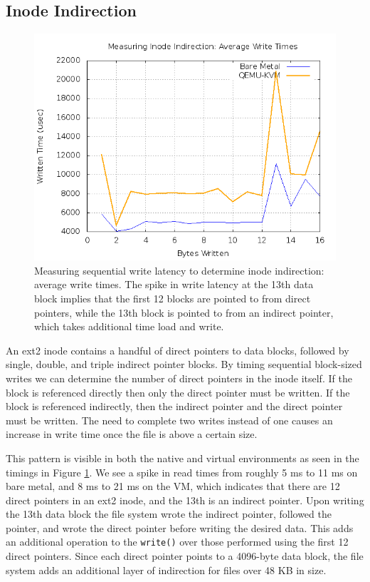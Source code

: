 \documentclass[letterpaper,twocolumn,10pt]{article}
\begin{document}
\subsection{Inode Indirection}
\begin{figure}[!ht]
\includegraphics[scale=.35]{combined_graphs/inode_avg.png}
\caption{Measuring sequential write latency to determine inode indirection: average write times. The spike in write latency at the 13th data block implies that the first 12 blocks are pointed to from direct pointers, while the 13th block is pointed to from an indirect pointer, which takes additional time load and write.}
\label{fig:inode_avg}
\end{figure}
An ext2 inode contains a handful of direct pointers to data blocks, followed by single, double, and triple indirect pointer blocks.
By timing sequential block-sized writes we can determine the number of direct pointers in the inode itself.
If the block is referenced directly then only the direct pointer must be written.
If the block is referenced indirectly, then the indirect pointer and the direct pointer must be written.
The need to complete two writes instead of one causes an increase in write time once the file is above a certain size.

This pattern is visible in both the native and virtual environments as seen in the timings in Figure \ref{fig:inode_avg}. %
We see a spike in read times from roughly 5 ms to 11 ms on bare metal, and 8 ms to 21 ms on the VM, which indicates that there are 12 direct pointers in an ext2 inode, and the 13th is an indirect pointer. 
Upon writing the 13th data block the file system wrote the indirect pointer, followed the pointer, and wrote the direct pointer before writing the desired data.
This adds an additional operation to the \verb~write()~ over those performed using the first 12 direct pointers. 
Since each direct pointer points to a 4096-byte data block, the file system adds an additional layer of indirection for files over 48 KB in size.
\end{document}
